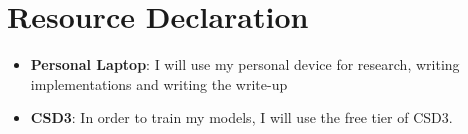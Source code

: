 \documentclass{article}
\begin{document}
\section{Resource Declaration}

\begin{itemize}
    \item \textbf{Personal Laptop}: I will use my personal device for research, writing implementations and writing the write-up
    \item \textbf{CSD3}: In order to train my models, I will use the free tier of CSD3.
\end{itemize}

\newpage
\printbibliography[
heading=bibintoc,
title={References}
]
\end{document}
